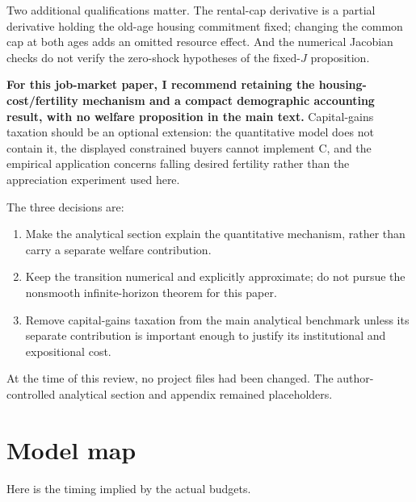 \documentclass[11pt,letterpaper]{article}
\providecommand{\tightlist}{\setlength{\itemsep}{0.25em}\setlength{\parskip}{0pt}}
\begin{document}
Two additional qualifications matter. The rental-cap derivative is a partial derivative
holding the old-age housing commitment fixed; changing the common cap at both ages adds an
omitted resource effect. And the numerical Jacobian checks do not verify the zero-shock
hypotheses of the fixed-\(J\) proposition.

\textbf{For this job-market paper, I recommend retaining the housing-cost/fertility
mechanism and a compact demographic accounting result, with no welfare proposition in the
main text.} Capital-gains taxation should be an optional extension: the quantitative model
does not contain it, the displayed constrained buyers cannot implement C, and the
empirical application concerns falling desired fertility rather than the appreciation
experiment used here.

The three decisions are:

\begin{enumerate}
\def\labelenumi{\arabic{enumi}.}
\tightlist
\item
  Make the analytical section explain the quantitative mechanism, rather than carry a
  separate welfare contribution.
\item
  Keep the transition numerical and explicitly approximate; do not pursue the nonsmooth
  infinite-horizon theorem for this paper.
\item
  Remove capital-gains taxation from the main analytical benchmark unless its separate
  contribution is important enough to justify its institutional and expositional cost.
\end{enumerate}

At the time of this review, no project files had been changed. The author-controlled
analytical section and appendix remained placeholders.

\clearpage
\section{Model map}\label{model-map}

Here is the timing implied by the actual budgets.

\begingroup\small\setlength{\tabcolsep}{5pt}\renewcommand{\arraystretch}{1.17}
\end{document}
